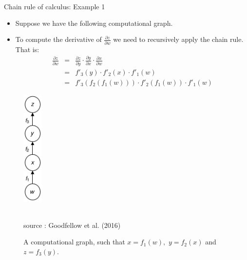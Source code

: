 \begin{vbframe}{Chain rule of calculus: Example 1}
  \begin{minipage}{0.5\textwidth}
    \begin{itemize}
      \item Suppose we have the following computational graph.
      \item To compute the derivative of $\frac{\partial z}{\partial w}$ %
      we need to recursively apply the chain rule. That is:
      \begin{eqnarray*}
        \frac{\partial z}{\partial w} &=& \frac{\partial z}{\partial y} \cdot \frac{\partial y}{\partial x} \cdot \frac{\partial x}{\partial w} \\
                                  &=& f'_3(y) \cdot f'_2(x) \cdot f'_1(w) \\
                                  &=& f'_3(f_2(f_1(w))) \cdot f'_2(f_1(w)) \cdot f'_1(w)
      \end{eqnarray*}
    \end{itemize}
  \end{minipage}\hfill
  \begin{minipage}{0.32\textwidth}
    \begin{figure}
      \centering
        \includegraphics[width=1cm]{figure/compgraph2.png}
        \begin{footnotesize}
        \tiny{\\source : Goodfellow et al. (2016)}
        \caption{A computational graph, such that $x = f_1(w),$ $y = f_2(x)$ and $z = f_3(y)$.}
        \end{footnotesize}
    \end{figure}
  \end{minipage}
\end{vbframe}

